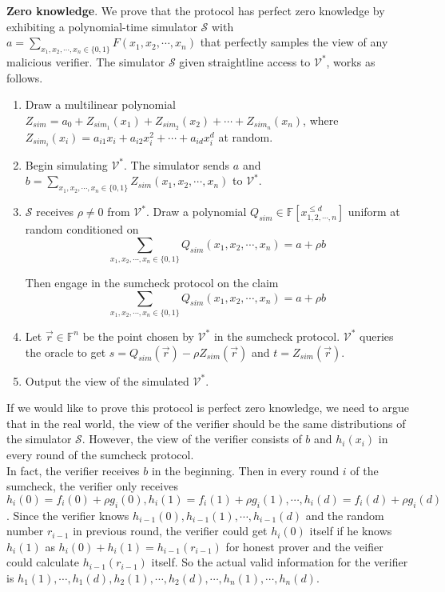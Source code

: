 \noindent
\textbf{Zero knowledge}. We prove that the protocol has perfect zero knowledge by exhibiting a polynomial-time simulator $\mathcal{S}$ with $a = \sum\limits_{x_1, x_2, \cdots, x_n \in \{0, 1\}}F(x_1, x_2, \cdots, x_n)$ that perfectly samples the view of any malicious verifier. The simulator $\mathcal{S}$ given straightline access to $\mathcal{V^*}$, works as follows.

\begin{enumerate}

\item Draw a multilinear polynomial $Z_{sim} = a_{0} + Z_{sim_1}(x_1) + Z_{sim_2}(x_2) + \cdots + Z_{sim_n}(x_n)$, where $Z_{sim_i}(x_i) = a_{i1}x_i + a_{i2}x_i^2 + \cdots + a_{id}x_i^d$ at random. 

\item Begin simulating $\mathcal{V}^*$. The simulator sends $a$ and $b = \sum\limits_{x_1, x_2, \cdots, x_n \in \{0, 1\}}Z_{sim}(x_1, x_2, \cdots, x_n)$ to $\mathcal{V}^*$.

\item $\mathcal{S}$ receives $\rho \neq 0$ from $\mathcal{V^*}$. Draw a polynomial $Q_{sim} \in \mathbb{F}[x_{1, 2, \cdots, n}^{\leqslant d}]$ uniform at random conditioned on $$ \sum\limits_{x_1, x_2, \cdots, x_n \in \{0, 1\}}Q_{sim}(x_1, x_2, \cdots, x_n) = a + \rho b$$ 

Then engage in the sumcheck protocol on the claim $$\sum\limits_{x_1, x_2, \cdots, x_n \in \{0, 1\}}Q_{sim}(x_1, x_2, \cdots, x_n) = a + \rho b$$

\item Let $\vec{r} \in \mathbb{F}^n$ be the point chosen by $\mathcal{V}^*$ in the sumcheck protocol. $\mathcal{V}^*$ queries the oracle to get $s = Q_{sim}(\vec{r}) - \rho Z_{sim}(\vec{r})$ and $t = Z_{sim}(\vec{r})$. 

\item Output the view of the simulated $\mathcal{V}^*$.
\end{enumerate} 

If we would like to prove this protocol is perfect zero knowledge, we need to argue that in the real world, the view of the verifier should be the same distributions of the simulator $\mathcal{S}$. However, the view of the verifier consists of $b$ and $h_i(x_i)$ in every round of the sumcheck protocol.\\

In fact, the verifier receives $b$ in the beginning. Then in every round $i$ of the sumcheck, the verifier only receives $h_i(0) = f_i(0) + \rho g_i(0), h_i(1) = f_i(1) + \rho g_i(1), \cdots, h_i(d) = f_i(d) + \rho g_i(d)$. Since the verifier knows $h_{i-1}(0), h_{i-1}(1), \cdots, h_{i-1}(d)$ and the random number $r_{i-1}$ in previous round, the verifier could get $h_{i}(0)$ itself if he knows $h_{i}(1)$ as $h_{i}(0) + h_i(1) = h_{i-1}(r_{i-1})$ for honest prover and the veifier could calculate $h_{i-1}(r_{i-1})$ itself. So the actual valid information for the verifier is $h_{1}(1), \cdots, h_{1}(d), h_{2}(1), \cdots, h_2(d), \cdots, h_{n}(1), \cdots, h_{n}(d)$. \\

